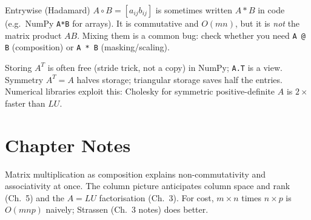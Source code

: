 \begin{example}
Entrywise (Hadamard) $A\circ B=[a_{ij}b_{ij}]$ is sometimes written $A*B$ in code (e.g.\ NumPy \texttt{A*B} for arrays). It is commutative and $O(mn)$, but it is \emph{not} the matrix product $AB$. Mixing them is a common bug: check whether you need \texttt{A @ B} (composition) or \texttt{A * B} (masking/scaling).
\end{example}

\begin{remark}
Storing $A^T$ is often free (stride trick, not a copy) in NumPy; \texttt{A.T} is a view. Symmetry $A^T=A$ halves storage; triangular storage saves half the entries. Numerical libraries exploit this: Cholesky for symmetric positive-definite $A$ is $2\times$ faster than $LU$.
\end{remark}


\section{Chapter Notes}
Matrix multiplication as composition explains non-commutativity and associativity at once. The column picture anticipates column space and rank (Ch.~5) and the $A=LU$ factorisation (Ch.~3). For cost, $m\times n$ times $n\times p$ is $O(mnp)$ naively; Strassen (Ch.~3 notes) does better.

